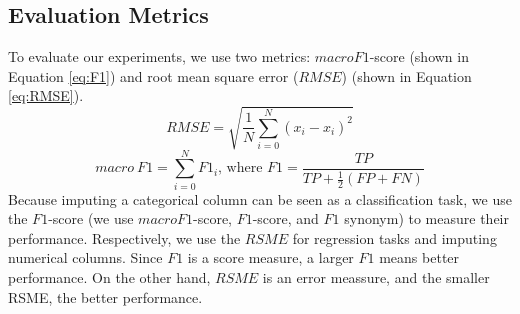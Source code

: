 \subsection{Evaluation Metrics}
%
To evaluate our experiments, we use two metrics: $macro F1$-score (shown in Equation \ref{eq:F1}) and root mean square error ($RMSE$) (shown in Equation \ref{eq:RMSE}).
%
\begin{equation}
	RMSE = \sqrt{\frac{1}{N} \sum_{i = 0}^{N} (x_i - \hat{x_i})^2}
	\label{eq:RMSE}
\end{equation}
%
\begin{equation}
	macro\ F1 = \sum_{i = 0}^{N} F1_i\text{, where }F1 = \frac{TP}{TP + \frac{1}{2}(FP + FN)}
	\label{eq:F1}
\end{equation}
%
Because imputing a categorical column can be seen as a classification task, we use the $F1$-score (we use $macro F1$-score, $F1$-score, and $F1$ synonym) to measure their performance. Respectively, we use the $RSME$ for regression tasks and imputing numerical columns. Since $F1$ is a score measure, a larger $F1$ means better performance. On the other hand, $RSME$ is an error meassure, and the smaller RSME, the better performance.
